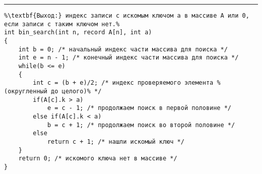 \vspace{5pt} \hrule
\begin{lstlisting}[caption={Бинарный поиск}, label=p316_bin_search, escapechar=\%]
%\noindent\textbf{Вход:} упорядоченный массив A: \textbf{array} [1..n] \textbf{of record} k: key; i: info \textbf{end record}; ключ a: key.\\%
%\textbf{Выход:} индекс записи с искомым ключом a в массиве A или 0, если записи с таким ключом нет.%
int bin_search(int n, record A[n], int a)
{
	int b = 0; /* начальный индекс части массива для поиска */
	int e = n - 1; /* конечный индекс части массива для поиска */
	while(b <= e)
	{
		int c = (b + e)/2; /* индекс проверяемого элемента %(округленный до целого)% */
		if(A[c].k > a)
			e = c - 1; /* продолжаем поиск в первой половине */
		else if(A[c].k < a)
			b = c + 1; /* продолжаем поиск во второй половине */
		else
			return c + 1; /* нашли искомый ключ */
	}
	return 0; /* искомого ключа нет в массиве */
}
\end{lstlisting}
